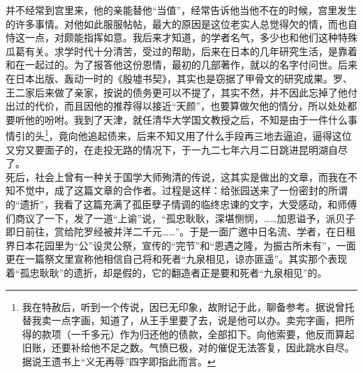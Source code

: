 并不经常到宫里来，他的亲能替他“当值”，经常告诉他当他不在的时候，宫里发生的许多事情。对他如此服服帖帖，最大的原因是这位老实人总觉得欠的情，而也自恃这一点，对颇能指挥如意。我后来才知道，的学者名气，多少也和他们这种特殊瓜葛有关。求学时代十分清苦，受过的帮助，后来在日本的几年研究生活，是靠着和在一起过的。为了报答他这份恩情，最初的几部著作，就以的名字付问世。后来在日本出版、轰动一时的《殷墟书契》，其实也是窃据了甲骨文的研究成果。罗、王二家后来做了亲家，按说的债务更可以不提了，其实不然，并不因此忘掉了他付出过的代价，而且因他的推荐得以接近“天颜”，也要算做欠他的情分，所以处处都要听他的吩咐。我到了天津，就任清华大学国文教授之后，不知是由于一件什么事情引的头\footnote{我在特赦后，听到一个传说，因已无印象，故附记于此，聊备参考。据说曾托替我卖一点字画，知道了，从王手里要了去，说是他可以办。卖完字画，把所得的款项（一千多元）作为归还他的债款，全部扣下。向他索要，他反而算起旧账，还要补给他不足之数。气愤已极，对的催促无法答复，因此跳水自尽。据说王遗书上“义无再辱”四字即指此而言。}，竟向他追起债来，后来不知又用了什么手段再三地去逼迫，逼得这位又穷又要面子的，在走投无路的情况下，于一九二七年六月二日跳进昆明湖自尽了。\\

死后，社会上曾有一种关于国学大师殉清的传说，这其实是做出的文章，而我在不知不觉中，成了这篇文章的合作者。过程是这样：给张园送来了一份密封的所谓的“遗折”，我看了这篇充满了孤臣孽子情调的临终忠谏的文字，大受感动，和师傅们商议了一下，发了一道“上谕”说，“孤忠耿耿，深堪恻悯，……加恩谥予，派贝子即日前往，赏给陀罗经被并洋二千元……”。于是一面广邀中日名流、学者，在日租界日本花园里为“公”设灵公祭，宣传的“完节”和“恩遇之隆，为振古所未有”，一面更在一篇祭文里宣称他相信自己将和死者“九泉相见，谅亦匪遥”。其实那个表现着“孤忠耿耿”的遗折，却是假的，它的翻造者正是要和死者“九泉相见”的。\\

